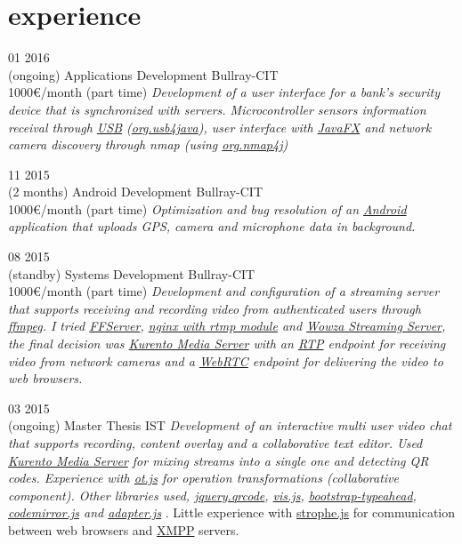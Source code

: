 \documentclass[]{friggeri-cv}
\begin{document}
\section{experience}


\begin{entrylist}

  \entry
    {01 2016\\(ongoing)}
    {Applications Development}
    {Bullray-CIT\\1000€/month (part time)}
    {\emph{Development of a user interface for a bank's security device that is synchronized with servers. Microcontroller sensors information receival through \underline{USB} (\underline{org.usb4java}), user interface with \underline{JavaFX} and network camera discovery through nmap (using \underline{org.nmap4j}) } }

 \entry
    {11 2015\\(2 months)}
    {Android Development}
    {Bullray-CIT\\1000€/month (part time)}
    {\emph{Optimization and bug resolution of an \underline{Android} application that uploads GPS, camera and microphone data in background.}}
 

\entry
    {08 2015\\(standby)}
    {Systems Development}
    {Bullray-CIT\\1000€/month (part time)}
    {\emph{Development and configuration of a streaming server that supports receiving and recording video from authenticated users through \underline{ffmpeg}. I tried \underline{FFServer}, \underline{nginx with rtmp module} and \underline{Wowza Streaming Server}, the final decision was \underline{Kurento Media Server} with an \underline{RTP} endpoint for receiving video from network cameras and a \underline{WebRTC} endpoint for delivering the video to web browsers. }}

\entry
    {03 2015\\(ongoing)}
    {Master Thesis}
    {IST}
    {\emph{Development of an interactive multi user video chat that supports recording, content overlay and a collaborative text editor. Used \underline{Kurento Media Server} for mixing streams into a single one and detecting QR codes. Experience with \underline{ot.js} for operation transformations (collaborative component). Other libraries used, \underline{jquery.qrcode}, \underline{vis.js}, \underline{bootstrap-typeahead}, \underline{codemirror.js} and \underline{adapter.js} }. Little experience with \underline{strophe.js} for communication between web browsers and \underline{XMPP} servers. }
    

\end{entrylist}
\end{document}
